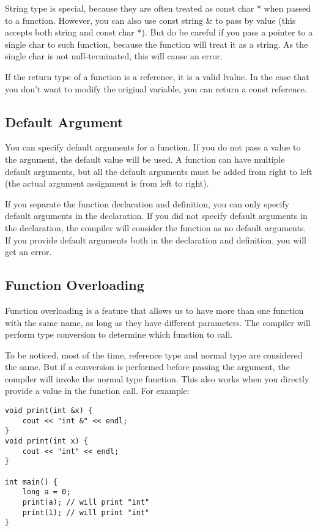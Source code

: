 \documentclass[a4paper,12pt]{article}
\begin{document}
String type is special, because they are often treated as const char * when passed to a function.
However, you can also use const string \& to pass by value (this accepts both string and const char *).
But do be careful if you pass a pointer to a single char to such function, because the function will treat it as a string.
As the single char is not null-terminated, this will cause an error.

If the return type of a function is a reference, it is a valid lvalue.
In the case that you don't want to modify the original variable, you can return a const reference.

\subsection{Default Argument}

You can specify default arguments for a function.
If you do not pass a value to the argument, the default value will be used.
A function can have multiple default arguments, but all the default arguments must be added from right to left (the actual argument assignment is from left to right).

If you separate the function declaration and definition, you can only specify default arguments in the declaration.
If you did not specify default arguments in the declaration, the compiler will consider the function as no default arguments.
If you provide default arguments both in the declaration and definition, you will get an error.

\subsection{Function Overloading}

Function overloading is a feature that allows us to have more than one function with the same name, as long as they have different parameters.
The compiler will perform type conversion to determine which function to call.

To be noticed, most of the time, reference type and normal type are considered the same.
But if a conversion is performed before passing the argument, the compiler will invoke the normal type function.
This also works when you directly provide a value in the function call.
For example:
\begin{verbatim}
void print(int &x) {
    cout << "int &" << endl;
}
void print(int x) {
    cout << "int" << endl;
}

int main() {
    long a = 0;
    print(a); // will print "int"
    print(1); // will print "int"
}
\end{verbatim}
\end{document}
